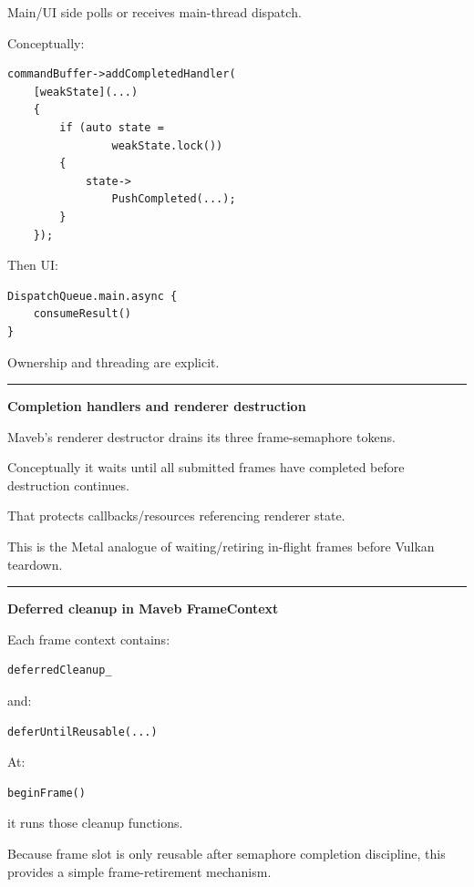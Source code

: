 Main/UI side polls or receives main-thread dispatch.

Conceptually:

\begin{verbatim}
commandBuffer->addCompletedHandler(
    [weakState](...)
    {
        if (auto state =
                weakState.lock())
        {
            state->
                PushCompleted(...);
        }
    });
\end{verbatim}

Then UI:

\begin{verbatim}
DispatchQueue.main.async {
    consumeResult()
}
\end{verbatim}

Ownership and threading are explicit.

\begin{center}\rule{0.5\linewidth}{0.5pt}\end{center}

\textbf{Completion handlers and renderer destruction}

Maveb's renderer destructor drains its three frame-semaphore tokens.

Conceptually it waits until all submitted frames have completed before destruction continues.

That protects callbacks/resources referencing renderer state.

This is the Metal analogue of waiting/retiring in-flight frames before Vulkan teardown.

\begin{center}\rule{0.5\linewidth}{0.5pt}\end{center}

\textbf{Deferred cleanup in Maveb FrameContext}

Each frame context contains:

\begin{verbatim}
deferredCleanup_
\end{verbatim}

and:

\begin{verbatim}
deferUntilReusable(...)
\end{verbatim}

At:

\begin{verbatim}
beginFrame()
\end{verbatim}

it runs those cleanup functions.

Because frame slot is only reusable after semaphore completion discipline, this provides a simple frame-retirement mechanism.

